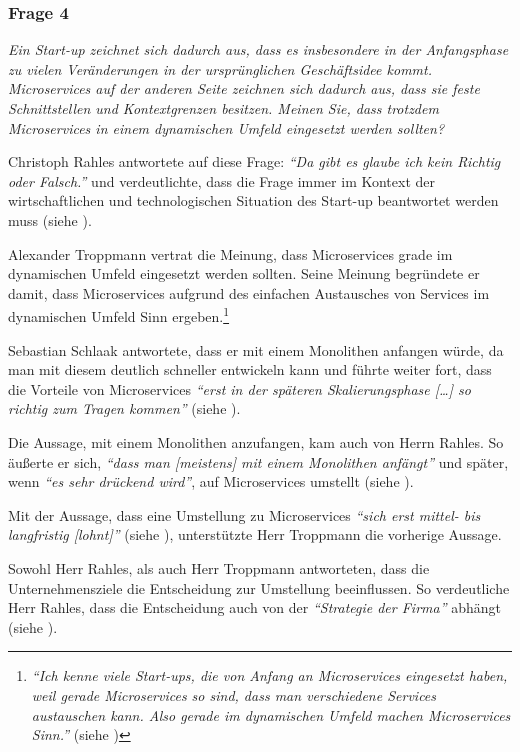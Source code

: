 \subsubsection{Frage 4}
\label{sec:frage4}

\textit{Ein Start-up zeichnet sich dadurch aus, dass es insbesondere in der Anfangsphase zu vielen Veränderungen in der ursprünglichen Geschäftsidee kommt. Microservices auf der anderen Seite zeichnen sich dadurch aus, dass sie feste Schnittstellen und Kontextgrenzen besitzen. Meinen Sie, dass trotzdem Microservices in einem dynamischen Umfeld eingesetzt werden sollten?}

Christoph Rahles antwortete auf diese Frage: \textit{\enquote{Da gibt es glaube ich kein Richtig oder Falsch.}} und verdeutlichte, dass die Frage immer im Kontext der wirtschaftlichen und technologischen Situation des Start-up beantwortet werden muss (siehe ).

Alexander Troppmann vertrat die Meinung, dass Microservices grade im dynamischen Umfeld eingesetzt werden sollten. Seine Meinung begründete er damit, dass Microservices aufgrund des einfachen Austausches von Services im dynamischen Umfeld Sinn ergeben.\footnote{
\textit{\enquote{Ich kenne viele Start-ups, die von Anfang an Microservices eingesetzt haben, weil gerade Microservices so sind, dass man verschiedene Services austauschen kann. Also gerade im dynamischen Umfeld machen Microservices Sinn.}} (siehe )
}

Sebastian Schlaak antwortete, dass er mit einem Monolithen anfangen würde, da man mit diesem deutlich schneller entwickeln kann und führte weiter fort, dass die Vorteile von Microservices \textit{\enquote{erst in der späteren Skalierungsphase […] so richtig zum Tragen kommen}} (siehe ).

Die Aussage, mit einem Monolithen anzufangen, kam auch von Herrn Rahles. So äußerte er sich, \textit{\enquote{dass man [meistens] mit einem Monolithen anfängt}} und später, wenn \textit{\enquote{es sehr drückend wird}}, auf Microservices umstellt (siehe ).

Mit der Aussage, dass eine Umstellung zu Microservices \textit{\enquote{sich erst mittel- bis langfristig [lohnt]}} (siehe ), unterstützte Herr Troppmann die vorherige Aussage.

Sowohl Herr Rahles, als auch Herr Troppmann antworteten, dass die Unternehmensziele die Entscheidung zur Umstellung beeinflussen. So verdeutliche Herr Rahles, dass die Entscheidung auch von der \textit{\enquote{Strategie der Firma}} abhängt (siehe ).

